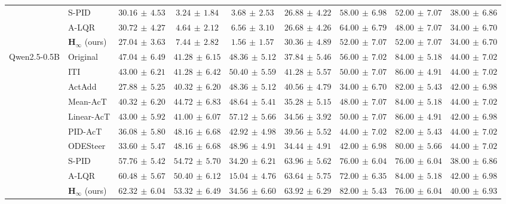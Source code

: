 \begin{table}[!htbp]
{\begin{tabular}{llcccc|ccc}
 & S-PID & $30.16\,\pm\,4.53$ & $3.24\,\pm\,1.84$ & $3.68\,\pm\,2.53$ & $26.88\,\pm\,4.22$ & $58.00\,\pm\,6.98$ & $52.00\,\pm\,7.07$ & $38.00\,\pm\,6.86$\\
 & A-LQR & $30.72\,\pm\,4.27$ & $4.64\,\pm\,2.12$ & $6.56\,\pm\,3.10$ & $26.68\,\pm\,4.26$ & $64.00\,\pm\,6.79$ & $48.00\,\pm\,7.07$ & $34.00\,\pm\,6.70$\\
 & $\boldsymbol{H_\infty}$ (ours) & $27.04\,\pm\,3.63$ & $7.44\,\pm\,2.82$ & $1.56\,\pm\,1.57$ & $30.36\,\pm\,4.89$ & $52.00\,\pm\,7.07$ & $52.00\,\pm\,7.07$ & $34.00\,\pm\,6.70$\\
\midrule
\multirow{10}{*}{Qwen2.5-0.5B} & Original & $47.04\,\pm\,6.49$ & $41.28\,\pm\,6.15$ & $48.36\,\pm\,5.12$ & $37.84\,\pm\,5.46$ & $56.00\,\pm\,7.02$ & $84.00\,\pm\,5.18$ & $44.00\,\pm\,7.02$\\
 & ITI & $43.00\,\pm\,6.21$ & $41.28\,\pm\,6.42$ & $50.40\,\pm\,5.59$ & $41.28\,\pm\,5.57$ & $50.00\,\pm\,7.07$ & $86.00\,\pm\,4.91$ & $44.00\,\pm\,7.02$\\
 & ActAdd & $27.88\,\pm\,5.25$ & $40.32\,\pm\,6.20$ & $48.36\,\pm\,5.12$ & $40.56\,\pm\,4.79$ & $34.00\,\pm\,6.70$ & $82.00\,\pm\,5.43$ & $42.00\,\pm\,6.98$\\
 & Mean-AcT & $40.32\,\pm\,6.20$ & $44.72\,\pm\,6.83$ & $48.64\,\pm\,5.41$ & $35.28\,\pm\,5.15$ & $48.00\,\pm\,7.07$ & $84.00\,\pm\,5.18$ & $44.00\,\pm\,7.02$\\
 & Linear-AcT & $43.00\,\pm\,5.92$ & $41.00\,\pm\,6.07$ & $57.12\,\pm\,5.66$ & $34.56\,\pm\,3.92$ & $50.00\,\pm\,7.07$ & $86.00\,\pm\,4.91$ & $42.00\,\pm\,6.98$\\
 & PID-AcT & $36.08\,\pm\,5.80$ & $48.16\,\pm\,6.68$ & $42.92\,\pm\,4.98$ & $39.56\,\pm\,5.52$ & $44.00\,\pm\,7.02$ & $82.00\,\pm\,5.43$ & $44.00\,\pm\,7.02$\\
 & ODESteer & $33.60\,\pm\,5.47$ & $48.16\,\pm\,6.68$ & $48.96\,\pm\,4.91$ & $34.44\,\pm\,4.91$ & $42.00\,\pm\,6.98$ & $80.00\,\pm\,5.66$ & $44.00\,\pm\,7.02$\\
 & S-PID & $57.76\,\pm\,5.42$ & $54.72\,\pm\,5.70$ & $34.20\,\pm\,6.21$ & $63.96\,\pm\,5.62$ & $76.00\,\pm\,6.04$ & $76.00\,\pm\,6.04$ & $38.00\,\pm\,6.86$\\
 & A-LQR & $60.48\,\pm\,5.67$ & $50.40\,\pm\,6.12$ & $15.04\,\pm\,4.76$ & $63.64\,\pm\,5.75$ & $72.00\,\pm\,6.35$ & $84.00\,\pm\,5.18$ & $42.00\,\pm\,6.98$\\
 & $\boldsymbol{H_\infty}$ (ours) & $62.32\,\pm\,6.04$ & $53.32\,\pm\,6.49$ & $34.56\,\pm\,6.60$ & $63.92\,\pm\,6.29$ & $82.00\,\pm\,5.43$ & $76.00\,\pm\,6.04$ & $40.00\,\pm\,6.93$\\

\end{tabular}}
\end{table}
